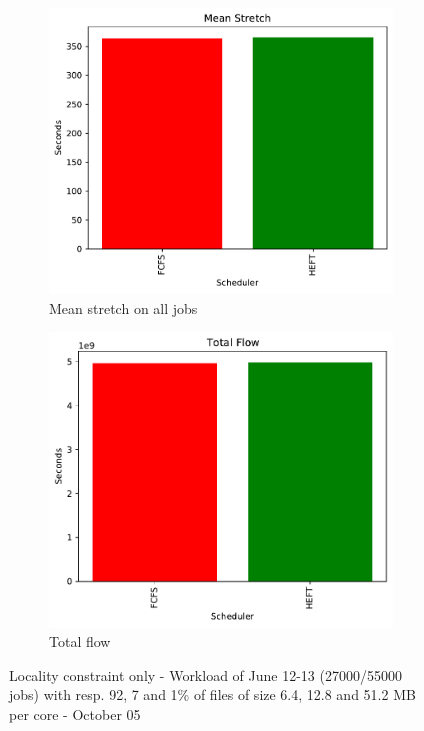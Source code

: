 \documentclass[a4paper]{article}
\begin{document}
\begin{figure}[H]
\begin{subfigure}[b]{0.4\linewidth}\centering\includegraphics[width=0.9\linewidth]{MBSS/plot/Results_FCFS_Score_Adaptative_Multiplier_2022-06-12->2022-06-13_V9271_Mean_Stretch_450_128_32_256_4_1024.pdf}\caption{Mean stretch on all jobs}\end{subfigure}
\begin{subfigure}[b]{0.4\linewidth}\centering\includegraphics[width=0.9\linewidth]{MBSS/plot/Results_FCFS_Score_Adaptative_Multiplier_2022-06-12->2022-06-13_V9271_Total_flow_450_128_32_256_4_1024.pdf}\caption{Total flow}\end{subfigure}
\caption{Locality constraint only - Workload of June 12-13 (27000/55000 jobs) with resp. 92, 7 and 1\% of files of size 6.4, 12.8 and 51.2 MB per core - October 05}\end{figure}
\end{document}
